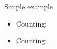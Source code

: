 \documentclass{article}
\begin{document}
\section{}
Simple example
\begin{itemize}
    \item Counting: 
\end{itemize}

\begin{itemize}
  \item Counting: 
\end{itemize}
\end{document}
